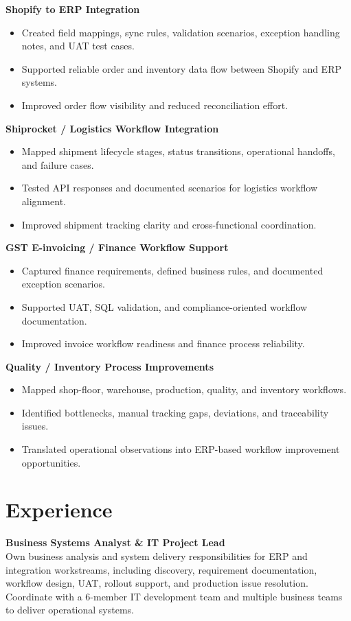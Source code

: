 \documentclass[10pt,a4paper]{article}
\begin{document}
\textbf{Shopify to ERP Integration}
\begin{itemize}
  \item Created field mappings, sync rules, validation scenarios, exception handling notes, and UAT test cases.
  \item Supported reliable order and inventory data flow between Shopify and ERP systems.
  \item Improved order flow visibility and reduced reconciliation effort.
\end{itemize}

\textbf{Shiprocket / Logistics Workflow Integration}
\begin{itemize}
  \item Mapped shipment lifecycle stages, status transitions, operational handoffs, and failure cases.
  \item Tested API responses and documented scenarios for logistics workflow alignment.
  \item Improved shipment tracking clarity and cross-functional coordination.
\end{itemize}

\textbf{GST E-invoicing / Finance Workflow Support}
\begin{itemize}
  \item Captured finance requirements, defined business rules, and documented exception scenarios.
  \item Supported UAT, SQL validation, and compliance-oriented workflow documentation.
  \item Improved invoice workflow readiness and finance process reliability.
\end{itemize}

\textbf{Quality / Inventory Process Improvements}
\begin{itemize}
  \item Mapped shop-floor, warehouse, production, quality, and inventory workflows.
  \item Identified bottlenecks, manual tracking gaps, deviations, and traceability issues.
  \item Translated operational observations into ERP-based workflow improvement opportunities.
\end{itemize}

\section*{Experience}
\textbf{Business Systems Analyst \& IT Project Lead}\\
Own business analysis and system delivery responsibilities for ERP and integration workstreams, including discovery, requirement documentation, workflow design, UAT, rollout support, and production issue resolution. Coordinate with a 6-member IT development team and multiple business teams to deliver operational systems.
\end{document}
